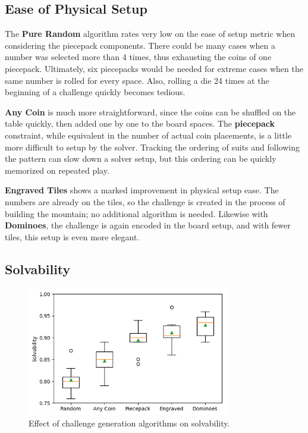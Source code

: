 \documentclass[journal]{IEEEtran}
\begin{document}
\subsection{Ease of Physical Setup}

The {\bf Pure Random} algorithm rates very low on the ease of setup metric when considering the piecepack components. There could be many cases when a number was selected more than 4 times, thus exhausting the coins of one piecepack. Ultimately, six piecepacks would be needed for extreme cases when the same number is rolled for every space. Also, rolling a die 24 times at the beginning of a challenge quickly becomes tedious. 

{\bf Any Coin} is much more straightforward, since the coins can be shuffled on the table quickly, then added one by one to the board spaces. The {\bf piecepack} constraint, while equivalent in the number of actual coin placements, is a little more difficult to setup by the solver. Tracking the ordering of suits and following the pattern can slow down a solver setup, but this ordering can be quickly memorized on repeated play.

{\bf Engraved Tiles} shows a marked improvement in physical setup ease.
The numbers are already on the tiles, so the challenge is created in the process of building the mountain; no additional algorithm is needed. Likewise with {\bf Dominoes}, the challenge is again encoded in the board setup, and with fewer tiles, this setup is even more elegant.

\subsection{Solvability}

\begin{figure}[t]
\includegraphics[width=8.8cm]{standalonesolve.png}
\caption{Effect of challenge generation algorithms on solvability.}
\label{fig:strategycomp}
\end{figure}
\end{document}
